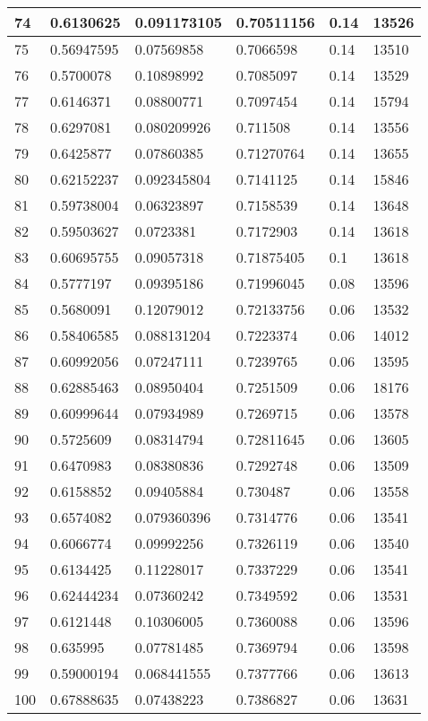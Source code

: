 \begin{longtable}{|l|l|l|l|l|l|}
74 & 0.6130625 & 0.091173105 & 0.70511156 & 0.14 & 13526 \\ \hline 
75 & 0.56947595 & 0.07569858 & 0.7066598 & 0.14 & 13510 \\ \hline 
76 & 0.5700078 & 0.10898992 & 0.7085097 & 0.14 & 13529 \\ \hline 
77 & 0.6146371 & 0.08800771 & 0.7097454 & 0.14 & 15794 \\ \hline 
78 & 0.6297081 & 0.080209926 & 0.711508 & 0.14 & 13556 \\ \hline 
79 & 0.6425877 & 0.07860385 & 0.71270764 & 0.14 & 13655 \\ \hline 
80 & 0.62152237 & 0.092345804 & 0.7141125 & 0.14 & 15846 \\ \hline 
81 & 0.59738004 & 0.06323897 & 0.7158539 & 0.14 & 13648 \\ \hline 
82 & 0.59503627 & 0.0723381 & 0.7172903 & 0.14 & 13618 \\ \hline 
83 & 0.60695755 & 0.09057318 & 0.71875405 & 0.1 & 13618 \\ \hline 
84 & 0.5777197 & 0.09395186 & 0.71996045 & 0.08 & 13596 \\ \hline 
85 & 0.5680091 & 0.12079012 & 0.72133756 & 0.06 & 13532 \\ \hline 
86 & 0.58406585 & 0.088131204 & 0.7223374 & 0.06 & 14012 \\ \hline 
87 & 0.60992056 & 0.07247111 & 0.7239765 & 0.06 & 13595 \\ \hline 
88 & 0.62885463 & 0.08950404 & 0.7251509 & 0.06 & 18176 \\ \hline 
89 & 0.60999644 & 0.07934989 & 0.7269715 & 0.06 & 13578 \\ \hline 
90 & 0.5725609 & 0.08314794 & 0.72811645 & 0.06 & 13605 \\ \hline 
91 & 0.6470983 & 0.08380836 & 0.7292748 & 0.06 & 13509 \\ \hline 
92 & 0.6158852 & 0.09405884 & 0.730487 & 0.06 & 13558 \\ \hline 
93 & 0.6574082 & 0.079360396 & 0.7314776 & 0.06 & 13541 \\ \hline 
94 & 0.6066774 & 0.09992256 & 0.7326119 & 0.06 & 13540 \\ \hline 
95 & 0.6134425 & 0.11228017 & 0.7337229 & 0.06 & 13541 \\ \hline 
96 & 0.62444234 & 0.07360242 & 0.7349592 & 0.06 & 13531 \\ \hline 
97 & 0.6121448 & 0.10306005 & 0.7360088 & 0.06 & 13596 \\ \hline 
98 & 0.635995 & 0.07781485 & 0.7369794 & 0.06 & 13598 \\ \hline 
99 & 0.59000194 & 0.068441555 & 0.7377766 & 0.06 & 13613 \\ \hline 
100 & 0.67888635 & 0.07438223 & 0.7386827 & 0.06 & 13631 \\ \hline 
\end{longtable}